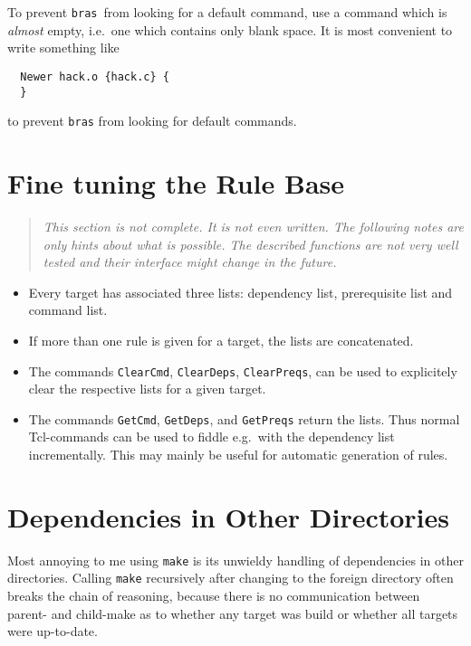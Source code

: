 \documentclass[12pt]{article}
\newcommand{\bras}{\texttt{bras}}
\newcommand{\make}{\texttt{make}}
\begin{document}
To prevent \bras\ from looking for a default command, use a command
which is \textit{almost} empty, i.e.\ one which contains only blank
space. It is most convenient to write something like
\begin{verbatim}
  Newer hack.o {hack.c} {
  }
\end{verbatim}
to prevent \bras{} from looking for default commands.

\section{Fine tuning the Rule Base}
\begin{quote}\itshape
This section is not complete. It is not even written. The following
notes are only hints about what is possible. The described functions
are not very well tested and their interface might change in the
future.
\end{quote}

\begin{itemize}
\item
Every target has associated three lists: dependency list, prerequisite
list and command list.
\item
If more than one rule is given for a target, the lists are
concatenated. 
\item
The commands \texttt{ClearCmd}, \texttt{ClearDeps},
\texttt{ClearPreqs}, can be used to explicitely clear the respective
lists for a given target.
\item
The commands \texttt{GetCmd}, \texttt{GetDeps}, and
\texttt{GetPreqs} return the lists. Thus normal Tcl-commands can be
used to fiddle e.g.\ with the dependency list incrementally. This may
mainly be useful for automatic generation of rules.
\end{itemize}


\section{Dependencies in Other Directories}

Most annoying to me using \make{} is its unwieldy handling of
dependencies in other directories. Calling \make{} recursively after
changing to the foreign directory often breaks the chain of reasoning,
because there is no communication between parent- and child-make as to
whether any target was build or whether all targets were up-to-date.
\end{document}
